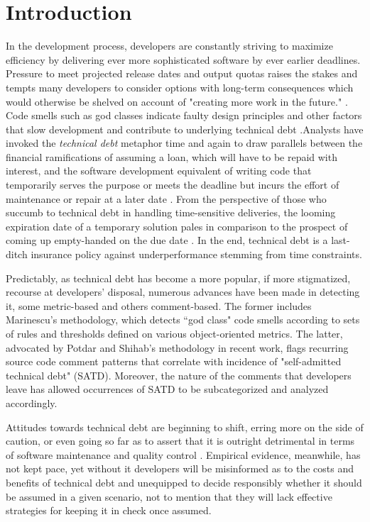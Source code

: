 \section{Introduction}
\label{chap4:sec:introduction}
\setlength\parindent{24pt} 

In the development process, developers are constantly striving to maximize efficiency by delivering ever more sophisticated software by ever earlier deadlines. Pressure to meet projected release dates and output quotas raises the stakes and tempts many developers to consider options with long-term consequences which would otherwise be shelved on account of "creating more work in the future." \cite{kruchten2013technical} \cite{seaman2015technical}. Code smells such as god classes indicate faulty design principles and other factors that slow development and contribute to underlying technical debt .Analysts have invoked the \emph{technical debt} metaphor time and again to draw parallels between the financial ramifications of assuming a loan, which will have to be repaid with interest, and the software development equivalent of writing code that temporarily serves the purpose or meets the deadline but incurs the effort of maintenance or repair at a later date \cite{cunningham1993wycash}. From the perspective of those who succumb to technical debt in handling time-sensitive deliveries, the looming expiration date of a temporary solution pales in comparison to the prospect of coming up empty-handed on the due date \cite{lim2012balancing}. In the end, technical debt is a last-ditch insurance policy against underperformance stemming from time constraints.




Predictably, as technical debt has become a more popular, if more stigmatized, recourse at developers' disposal, numerous advances have been made in detecting it, some metric-based and others comment-based. The former includes Marinescu's \cite{marinescu2004detection} methodology, which detects ``god class" code smells according to sets of rules and thresholds defined on various object-oriented metrics. The latter, advocated by Potdar and Shihab's \cite{ICSM_PotdarS14} methodology in recent work, flags recurring source code comment patterns that correlate with incidence of "self-admitted technical debt" (SATD). Moreover, the nature of the comments that developers leave has allowed occurrences of SATD to be subcategorized and analyzed accordingly.


Attitudes towards technical debt are beginning to shift, erring more on the side of caution, or even going so far as to assert that it is outright detrimental in terms of software maintenance and quality control \cite{zazworka2011investigating,spinola2013investigating,GuoSGCTSSS11,seaman2015technical,kruchten2013technical}. Empirical evidence, meanwhile, has not kept pace, yet without it developers will be misinformed as to the costs and benefits of technical debt and unequipped to decide responsibly whether it should be assumed in a given scenario, not to mention that they will lack effective strategies for keeping it in check once assumed.


